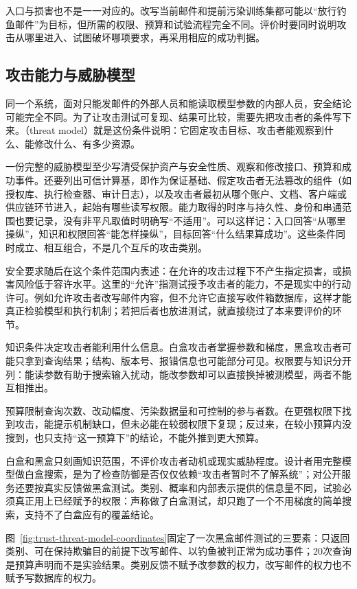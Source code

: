 入口与损害也不是一一对应的。改写当前邮件和提前污染训练集都可能以“放行钓鱼邮件”为目标，但所需的权限、预算和试验流程完全不同。评价时要同时说明攻击从哪里进入、试图破坏哪项要求，再采用相应的成功判据。

\subsection{攻击能力与威胁模型}
\label{sec:security-capabilities}

同一个系统，面对只能发邮件的外部人员和能读取模型参数的内部人员，安全结论可能完全不同。为了让攻击测试可复现、结果可比较，需要先把攻击者的条件写下来。（threat model）就是这份条件说明：它固定攻击目标、攻击者能观察到什么、能修改什么、有多少资源。

一份完整的威胁模型至少写清受保护资产与安全性质、观察和修改接口、预算和成功事件。还要列出可信计算基，即作为保证基础、假定攻击者无法篡改的组件（如授权库、执行检查器、审计日志），以及攻击者最初从哪个账户、文档、客户端或供应链环节进入，起始有哪些读写权限。能力取得的时序与持久性、身份和串通范围也要记录，没有非平凡取值时明确写“不适用”。可以这样记：入口回答“从哪里操纵”，知识和权限回答“能怎样操纵”，目标回答“什么结果算成功”。这些条件同时成立、相互组合，不是几个互斥的攻击类别。

安全要求随后在这个条件范围内表述：在允许的攻击过程下不产生指定损害，或损害风险低于容许水平。这里的“允许”指测试授予攻击者的能力，不是现实中的行动许可。例如允许攻击者改写邮件内容，但不允许它直接写收件箱数据库，这样才能真正检验模型和执行机制；若把后者也放进测试，就直接绕过了本来要评价的环节。

知识条件决定攻击者能利用什么信息。白盒攻击者掌握参数和梯度，黑盒攻击者可能只拿到查询结果；结构、版本号、报错信息也可能部分可见。权限要与知识分开列：能读参数有助于搜索输入扰动，能改参数却可以直接换掉被测模型，两者不能互相推出。

预算限制查询次数、改动幅度、污染数据量和可控制的参与者数。在更强权限下找到攻击，能提示机制缺口，但未必能在较弱权限下复现；反过来，在较小预算内没搜到，也只支持“这一预算下”的结论，不能外推到更大预算。

白盒和黑盒只刻画知识范围，不评价攻击者动机或现实威胁程度。设计者用完整模型做白盒搜索，是为了检查防御是否仅仅依赖“攻击者暂时不了解系统”；对公开服务还要按真实反馈做黑盒测试。类别、概率和内部表示提供的信息量不同，试验必须真正用上已经赋予的权限：声称做了白盒测试，却只跑了一个不用梯度的简单搜索，支持不了白盒应有的覆盖结论。

图~\ref{fig:trust-threat-model-coordinates}固定了一次黑盒邮件测试的三要素：只返回类别、可在保持欺骗目的前提下改写邮件、以钓鱼被判正常为成功事件；20次查询是预算声明而不是实验结果。类别反馈不赋予改参数的权力，改写邮件的权力也不赋予写数据库的权力。

